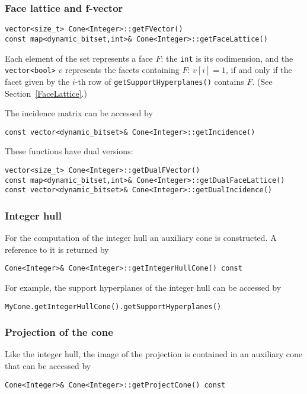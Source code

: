 \documentclass[12pt,a4paper]{scrartcl}
\theoremstyle{definition}
\begin{document}
\begin{small}
\subsubsection{Face lattice and f-vector}
\begin{Verbatim}
vector<size_t> Cone<Integer>::getFVector()
const map<dynamic_bitset,int>& Cone<Integer>::getFaceLattice()
\end{Verbatim}
Each element of the set represents a face $F$: the \verb|int| is its codimension, and the \verb|vector<bool>| $v$ represents the facets containing $F$: $v[i]=1$, if and only if the facet given by the $i$-th row of \verb|getSupportHyperplanes()| contains $F$. (See Section~\ref{FaceLattice}.)

The incidence matrix can be accessed by

\begin{Verbatim}
const vector<dynamic_bitset>& Cone<Integer>::getIncidence()
\end{Verbatim}

These functions have dual versions:

\begin{Verbatim}
vector<size_t> Cone<Integer>::getDualFVector()
const map<dynamic_bitset,int>& Cone<Integer>::getDualFaceLattice()
const vector<dynamic_bitset>& Cone<Integer>::getDualIncidence()
\end{Verbatim}

\subsubsection{Integer hull}

For the computation of the integer hull an auxiliary cone is constructed. A reference to it is returned by
\begin{Verbatim}
Cone<Integer>& Cone<Integer>::getIntegerHullCone() const
\end{Verbatim}

For example, the support hyperplanes of the integer hull can be accessed by
\begin{Verbatim}
MyCone.getIntegerHullCone().getSupportHyperplanes()
\end{Verbatim}

\subsubsection{Projection of the cone}

Like the integer hull, the image of the projection is contained in an auxiliary cone that can be accessed by
\begin{Verbatim}
Cone<Integer>& Cone<Integer>::getProjectCone() const
\end{Verbatim}


\end{small}
\end{document}
